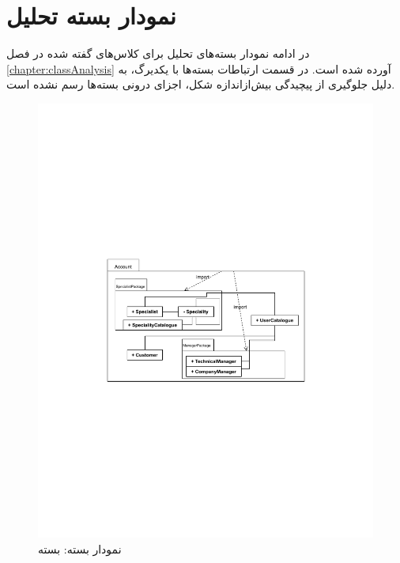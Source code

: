 \chapter{نمودار بسته تحلیل}

در ادامه نمودار بسته‌های تحلیل برای کلاس‌های گفته شده در فصل
\ref{chapter:classAnalysis}
آورده شده است. در قسمت ارتباطات بسته‌ها با یکدیرگ، به دلیل جلوگیری از پیچیدگی بیش‌از‌اندازه شکل، اجزای درونی بسته‌ها رسم نشده است.


\begin{figure}[ht!]
	\centering
	\includegraphics[scale=0.8]{figs/OOD-package-1.pdf}
	\caption{نمودار بسته: بسته }
\end{figure}
\FloatBarrier
\newpage

